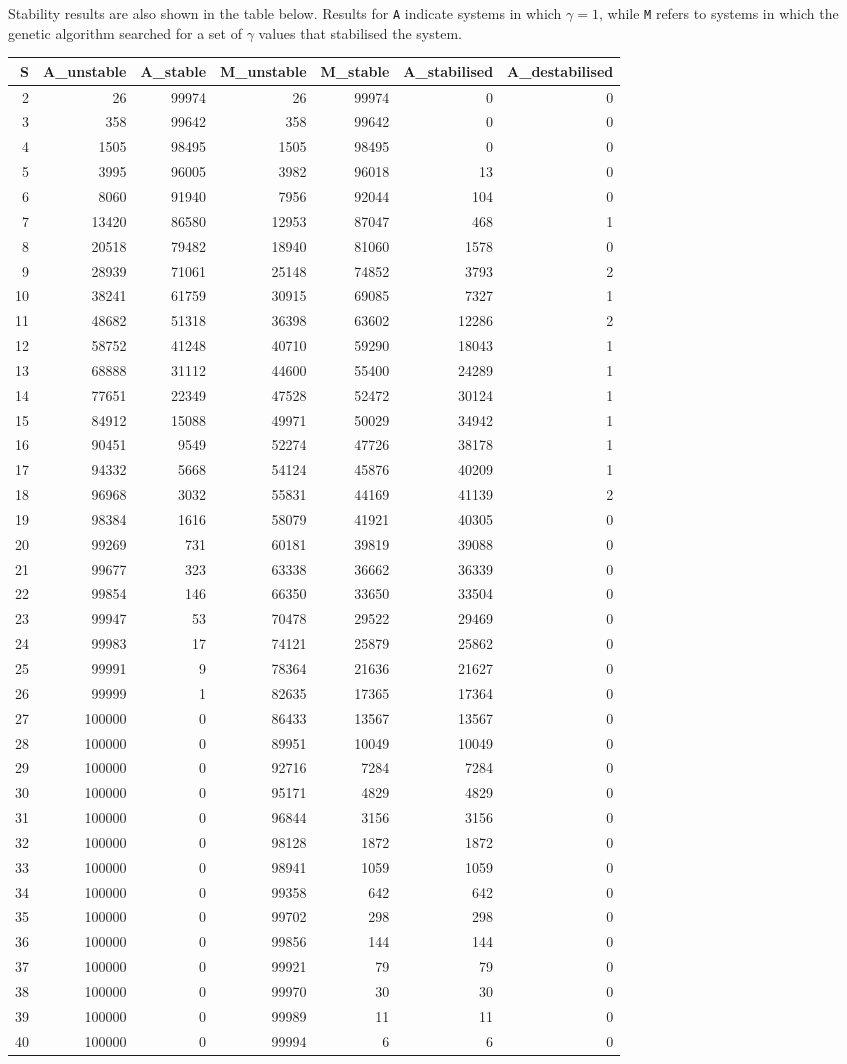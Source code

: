 \documentclass[]{article}
\begin{document}
Stability results are also shown in the table below. Results for
\texttt{A} indicate systems in which \(\gamma = 1\), while \texttt{M}
refers to systems in which the genetic algorithm searched for a set of
\(\gamma\) values that stabilised the system.

\begin{longtable}[]{@{}rrrrrrr@{}}
\toprule
S & A\_unstable & A\_stable & M\_unstable & M\_stable & A\_stabilised &
A\_destabilised\tabularnewline
\midrule
\endhead
2 & 26 & 99974 & 26 & 99974 & 0 & 0\tabularnewline
3 & 358 & 99642 & 358 & 99642 & 0 & 0\tabularnewline
4 & 1505 & 98495 & 1505 & 98495 & 0 & 0\tabularnewline
5 & 3995 & 96005 & 3982 & 96018 & 13 & 0\tabularnewline
6 & 8060 & 91940 & 7956 & 92044 & 104 & 0\tabularnewline
7 & 13420 & 86580 & 12953 & 87047 & 468 & 1\tabularnewline
8 & 20518 & 79482 & 18940 & 81060 & 1578 & 0\tabularnewline
9 & 28939 & 71061 & 25148 & 74852 & 3793 & 2\tabularnewline
10 & 38241 & 61759 & 30915 & 69085 & 7327 & 1\tabularnewline
11 & 48682 & 51318 & 36398 & 63602 & 12286 & 2\tabularnewline
12 & 58752 & 41248 & 40710 & 59290 & 18043 & 1\tabularnewline
13 & 68888 & 31112 & 44600 & 55400 & 24289 & 1\tabularnewline
14 & 77651 & 22349 & 47528 & 52472 & 30124 & 1\tabularnewline
15 & 84912 & 15088 & 49971 & 50029 & 34942 & 1\tabularnewline
16 & 90451 & 9549 & 52274 & 47726 & 38178 & 1\tabularnewline
17 & 94332 & 5668 & 54124 & 45876 & 40209 & 1\tabularnewline
18 & 96968 & 3032 & 55831 & 44169 & 41139 & 2\tabularnewline
19 & 98384 & 1616 & 58079 & 41921 & 40305 & 0\tabularnewline
20 & 99269 & 731 & 60181 & 39819 & 39088 & 0\tabularnewline
21 & 99677 & 323 & 63338 & 36662 & 36339 & 0\tabularnewline
22 & 99854 & 146 & 66350 & 33650 & 33504 & 0\tabularnewline
23 & 99947 & 53 & 70478 & 29522 & 29469 & 0\tabularnewline
24 & 99983 & 17 & 74121 & 25879 & 25862 & 0\tabularnewline
25 & 99991 & 9 & 78364 & 21636 & 21627 & 0\tabularnewline
26 & 99999 & 1 & 82635 & 17365 & 17364 & 0\tabularnewline
27 & 100000 & 0 & 86433 & 13567 & 13567 & 0\tabularnewline
28 & 100000 & 0 & 89951 & 10049 & 10049 & 0\tabularnewline
29 & 100000 & 0 & 92716 & 7284 & 7284 & 0\tabularnewline
30 & 100000 & 0 & 95171 & 4829 & 4829 & 0\tabularnewline
31 & 100000 & 0 & 96844 & 3156 & 3156 & 0\tabularnewline
32 & 100000 & 0 & 98128 & 1872 & 1872 & 0\tabularnewline
33 & 100000 & 0 & 98941 & 1059 & 1059 & 0\tabularnewline
34 & 100000 & 0 & 99358 & 642 & 642 & 0\tabularnewline
35 & 100000 & 0 & 99702 & 298 & 298 & 0\tabularnewline
36 & 100000 & 0 & 99856 & 144 & 144 & 0\tabularnewline
37 & 100000 & 0 & 99921 & 79 & 79 & 0\tabularnewline
38 & 100000 & 0 & 99970 & 30 & 30 & 0\tabularnewline
39 & 100000 & 0 & 99989 & 11 & 11 & 0\tabularnewline
40 & 100000 & 0 & 99994 & 6 & 6 & 0\tabularnewline
\bottomrule
\end{longtable}
\end{document}
